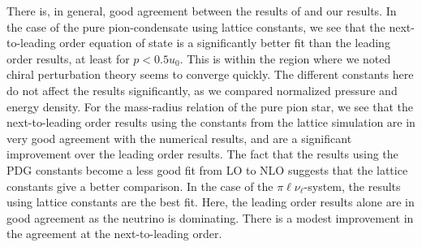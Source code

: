 There is, in general, good agreement between the results of \citeauthor{brandtNewClassCompact2018} and our results.
In the case of the pure pion-condensate using lattice constants, we see that the next-to-leading order equation of state is a significantly better fit than the leading order results, at least for $p<0.5 u_0$.
This is within the region where we noted chiral perturbation theory seems to converge quickly.
The different constants here do not affect the results significantly, as we compared normalized pressure and energy density.
For the mass-radius relation of the pure pion star, we see that the next-to-leading order results using the constants from the lattice simulation are in very good agreement with the numerical results, and are a significant improvement over the leading order results.
The fact that the results using the PDG constants become a less good fit from LO to NLO suggests that the lattice constants give a better comparison.
In the case of the $\pi\ell\nu_\ell$-system, the results using lattice constants are the best fit.
Here, the leading order results alone are in good agreement as the neutrino is dominating.
There is a modest improvement in the agreement at the next-to-leading order.

\clearpage

